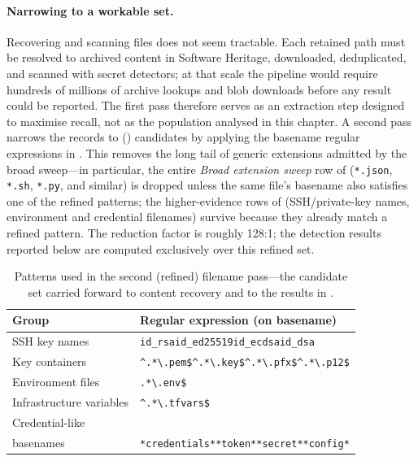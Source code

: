 \paragraph{Narrowing to a workable set.}
Recovering and scanning \SecretFirstExtractionShort files does not seem tractable.
Each retained path must be resolved to archived content in Software Heritage, downloaded, deduplicated, and scanned with secret detectors; at that scale the pipeline would require hundreds of millions of archive lookups and blob downloads before any result could be reported.
The first pass therefore serves as an extraction step designed to maximise recall, not as the population analysed in this chapter.
A second pass narrows the \SecretFirstExtractionShort records to \SecretSecondExtractionShort (\SecretSecondExtraction) candidates by applying the basename regular expressions in .
This removes the long tail of generic extensions admitted by the broad sweep---in particular, the entire \emph{Broad extension sweep} row of  (\texttt{*.json}, \texttt{*.sh}, \texttt{*.py}, and similar) is dropped unless the same file's basename also satisfies one of the refined patterns; the higher-evidence rows of  (SSH/private-key names, environment and credential filenames) survive because they already match a refined pattern.
The reduction factor is roughly \num{128}:1; the detection results reported below are computed exclusively over this refined set.

\begin{table}[h]
\centering
\caption{Patterns used in the second (refined) filename pass---the candidate set carried forward to content recovery and to the results in .}
\label{tab:sec-filename-refined}
\scriptsize
\renewcommand{\arraystretch}{1.15}
\begin{tabular}{@{}p{3.0cm}p{10.2cm}@{}}
\hline
\textbf{Group} & \textbf{Regular expression (on basename)} \\
\hline
SSH key names &
\texttt{id\_rsa}\quad \texttt{id\_ed25519}\quad \texttt{id\_ecdsa}\quad \texttt{id\_dsa} \\
\hline
Key containers &
\texttt{\textasciicircum.*\textbackslash.pem\$}\quad \texttt{\textasciicircum.*\textbackslash.key\$}\quad \texttt{\textasciicircum.*\textbackslash.pfx\$}\quad \texttt{\textasciicircum.*\textbackslash.p12\$} \\
\hline
Environment files &
\texttt{.*\textbackslash.env\$} \\
\hline
Infrastructure variables &
\texttt{\textasciicircum.*\textbackslash.tfvars\$} \\
\hline
Credential-like\\basenames &
\texttt{*credentials*}\quad \texttt{*token*}\quad \texttt{*secret*}\quad \texttt{*config*} \\
\hline
\end{tabular}
\end{table}


